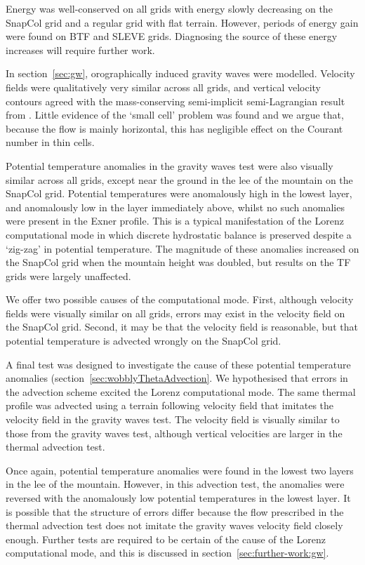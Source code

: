 Energy was well-conserved on all grids with energy slowly decreasing on the SnapCol grid and a regular grid with flat terrain.  However, periods of energy gain were found on BTF and SLEVE grids.  Diagnosing the source of these energy increases will require further work.

In section~\ref{sec:gw}, orographically induced gravity waves were modelled.  Velocity fields were qualitatively very similar across all grids, and vertical velocity contours agreed with the mass-conserving semi-implicit semi-Lagrangian result from \textcite{melvin2010}.  Little evidence of the `small cell' problem was found and we argue that, because the flow is mainly horizontal, this has negligible effect on the Courant number in thin cells.

Potential temperature anomalies in the gravity waves test were also visually similar across all grids, except near the ground in the lee of the mountain on the SnapCol grid.  Potential temperatures were anomalously high in the lowest layer, and anomalously low in the layer immediately above, whilst no such anomalies were present in the Exner profile.
This is a typical manifestation of the Lorenz computational mode in which discrete hydrostatic balance is preserved despite a `zig-zag' in potential temperature.
The magnitude of these anomalies increased on the SnapCol grid when the mountain height was doubled, but results on the TF grids were largely unaffected.

We offer two possible causes of the computational mode.  First, although velocity fields were visually similar on all grids, errors may exist in the velocity field on the SnapCol grid.  Second, it may be that the velocity field is reasonable, but that potential temperature is advected wrongly on the SnapCol grid.

A final test was designed to investigate the cause of these potential temperature anomalies (section~\ref{sec:wobblyThetaAdvection}.  We hypothesised that errors in the advection scheme excited the Lorenz computational mode.  The same thermal profile was advected using a terrain following velocity field that imitates the velocity field in the gravity waves test.  The velocity field is visually similar to those from the gravity waves test, although vertical velocities are larger in the thermal advection test.

Once again, potential temperature anomalies were found in the lowest two layers in the lee of the mountain.  However, in this advection test, the anomalies were reversed with the anomalously low potential temperatures in the lowest layer.  It is possible that the structure of errors differ because the flow prescribed in the thermal advection test does not imitate the gravity waves velocity field closely enough.  Further tests are required to be certain of the cause of the Lorenz computational mode, and this is discussed in section~\ref{sec:further-work:gw}.
